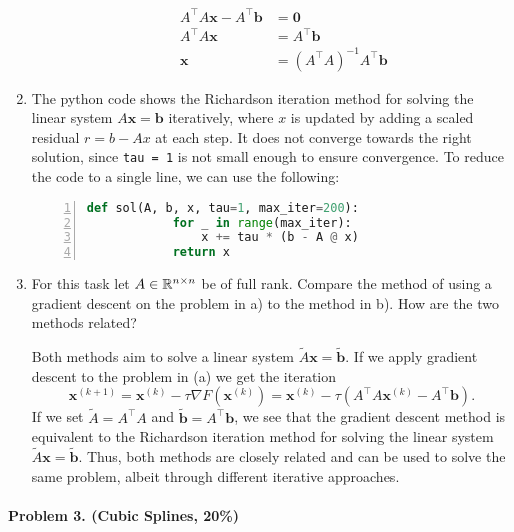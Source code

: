 \begin{enumerate}[label=(\alph*)]
\begin{itemize}
\begin{align*}
                        A^\top A \mathbf{x} - A^\top \mathbf{b} & = \mathbf{0}                                   \\
                        A^\top A \mathbf{x}                     & = A^\top \mathbf{b}                            \\
                        \mathbf{x}                              & = \left(A^\top A\right)^{-1} A^\top \mathbf{b}
                    \end{align*}
          \end{itemize}
    \item The python code shows the Richardson iteration method for solving the linear system \(A\mathbf{x} = \mathbf{b}\) iteratively, where \(x\) is updated by adding a scaled residual \(r = b - A x\) at each step.
          It does not converge towards the right solution, since \texttt{tau = 1} is not small enough to ensure convergence.
          To reduce the code to a single line, we can use the following:
          \begin{lstlisting}[language=Python, numbers=left, numberstyle=\tiny, stepnumber=1, numbersep=5pt]
        def sol(A, b, x, tau=1, max_iter=200):
            for _ in range(max_iter):
                x += tau * (b - A @ x)
            return x
    \end{lstlisting}
    \item For this task let \(A \in \mathbb{R}^{n \times n}\) be of full rank.
          Compare the method of using a gradient descent on the problem in a) to the
          method in b). How are the two methods related?

          Both methods aim to solve a linear system \(\tilde{A}\mathbf{x} = \tilde{\mathbf{b}}\). If we apply gradient descent to the problem in (a) we get the iteration
          \[
              \mathbf{x}^{(k+1)} = \mathbf{x}^{(k)} - \tau \nabla F(\mathbf{x}^{(k)}) = \mathbf{x}^{(k)} - \tau (A^\top A \mathbf{x}^{(k)} - A^\top \mathbf{b}).
          \]
          If we set \(\tilde{A} = A^\top A\) and \(\tilde{\mathbf{b}} = A^\top \mathbf{b}\), we see that the gradient descent method is equivalent to the Richardson iteration method for solving the linear system \(\tilde{A}\mathbf{x} = \tilde{\mathbf{b}}\). Thus, both methods are closely related and can be used to solve the same problem, albeit through different iterative approaches.
\end{enumerate}

\paragraph{Problem 3. (Cubic Splines, 20\%)}


